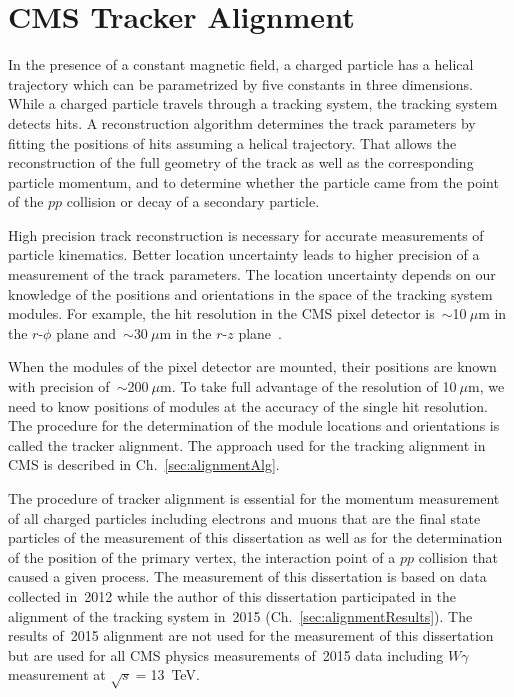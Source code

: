 \chapter{CMS Tracker Alignment} %
\label{sec:alignment}

In the presence of a constant magnetic field, a charged particle has a helical trajectory which can be parametrized by five constants in three dimensions. While a charged particle travels through a tracking system, the tracking system detects hits. A reconstruction algorithm determines the track parameters by fitting the positions of hits assuming a helical trajectory. That allows the reconstruction of the full geometry of the track as well as the corresponding particle momentum, and to determine whether the particle came from the point of the $pp$ collision or decay of a secondary particle.

High precision track reconstruction is necessary for accurate measurements of particle kinematics. Better location uncertainty leads to higher precision of a measurement of the track parameters. The location uncertainty depends on our knowledge of the positions and orientations in the space of the tracking system modules. For example, the hit resolution in the CMS pixel detector is~$\sim$10$~\mu$m in the $r$-$\phi$ plane and~$\sim$30$~\mu$m in the $r$-$z$ plane~\cite{ref_trackerPerformance}. 

When the modules of the pixel detector are mounted, their positions are known with precision of~$\sim$200$~\mu$m. To take full advantage of the resolution of 10$~\mu$m, we need to know positions of modules at the accuracy of the single hit resolution. The procedure for the determination of the module locations and orientations is called the tracker alignment. The approach used for the tracking alignment in CMS is described in Ch.~\ref{sec:alignmentAlg}.

The procedure of tracker alignment is essential for the momentum measurement of all charged particles including electrons and muons that are the final state particles of the measurement of this dissertation as well as for the determination of the position of the primary vertex, the interaction point of a $pp$ collision that caused a given process. The measurement of this dissertation is based on data collected in~2012 while the author of this dissertation participated in the alignment of the tracking system in~2015 (Ch.~\ref{sec:alignmentResults}). The results of~2015 alignment are not used for the measurement of this dissertation but are used for all CMS physics measurements of~2015 data including $W\gamma$ measurement at $\sqrt{s}=$13~TeV. 

